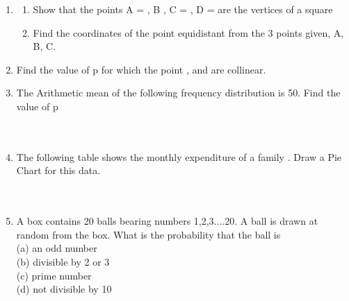 \documentclass[journal,12pt,twocolumn]{IEEEtran}
\renewcommand\thesection{\arabic{section}}
\begin{document}
\begin{enumerate}[label=\thesection.\arabic*.,ref=\thesection.\theenumi]
\item \begin{enumerate}
    \item Show that the points A = , B , C = , D =  are the vertices of a square\\
    \item Find the coordinates of the point equidistant from the 3 points given, A, B, C.\\
\end{enumerate}
\item Find the value of p for which the point ,  and  are collinear. \\

\item The Arithmetic mean of the following frequency distribution is 50. Find the value of p\\
\vspace{1mm}\\
\vspace{1mm}\\
\item The following table shows the monthly expenditure of a family
. Draw a Pie Chart for this data.\\
\vspace{2mm}\\
\\
\item A box contains 20 balls bearing numbers 1,2,3....20. A ball is drawn at random from the box. What is the probability that the ball is\\
(a) an odd number\\
(b) divisible by 2 or 3 \\
(c) prime number\\
(d) not divisible by 10\\
\end{enumerate}
\end{document}
